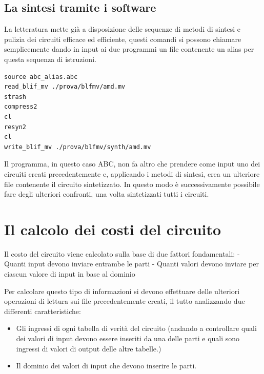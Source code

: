 \documentclass[
  italian,
]{book}
\providecommand{\tightlist}{%
  \setlength{\itemsep}{0pt}\setlength{\parskip}{0pt}}
\begin{document}
\newpage

\hypertarget{la-sintesi-tramite-i-software}{%
\subsection{La sintesi tramite i software}\label{la-sintesi-tramite-i-software}}

La letteratura mette già a disposizione delle sequenze di metodi di sintesi e pulizia dei circuiti efficace ed efficiente, questi comandi si possono chiamare semplicemente dando in input ai due programmi un file contenente un alias per questa sequenza di istruzioni.

\begin{verbatim}
source abc_alias.abc
read_blif_mv ./prova/blfmv/amd.mv
strash
compress2
cl
resyn2
cl
write_blif_mv ./prova/blfmv/synth/amd.mv
\end{verbatim}

Il programma, in questo caso ABC, non fa altro che prendere come input uno dei circuiti creati precedentemente e, applicando i metodi di sintesi, crea un ulteriore file contenente il circuito sintetizzato. In questo modo è successivamente possibile fare degli ulteriori confronti, una volta sintetizzati tutti i circuiti.

\hypertarget{il-calcolo-dei-costi-del-circuito}{%
\section{Il calcolo dei costi del circuito}\label{il-calcolo-dei-costi-del-circuito}}

Il costo del circuito viene calcolato sulla base di due fattori fondamentali:
- Quanti input devono inviare entrambe le parti
- Quanti valori devono inviare per ciascun valore di input in base al dominio

Per calcolare questo tipo di informazioni si devono effettuare delle ulteriori operazioni di lettura sui file precedentemente creati, il tutto analizzando due differenti caratteristiche:

\begin{itemize}
\tightlist
\item
  Gli ingressi di ogni tabella di verità del circuito (andando a controllare quali dei valori di input devono essere inseriti da una delle parti e quali sono ingressi di valori di output delle altre tabelle.)
\item
  Il dominio dei valori di input che devono inserire le parti.
\end{itemize}
\end{document}
